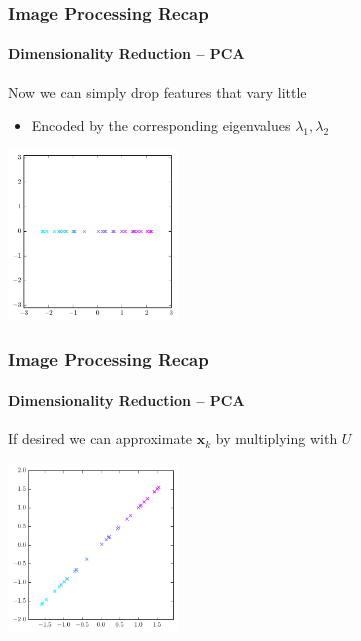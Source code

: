 \documentclass[xetex,professionalfont]{beamer}
\renewcommand{\vec}[1]{\ensuremath{\mathbf{#1}}}
\newcommand{\vx}{\vec{x}}
\begin{document}

\begin{frame}
\frametitle{Image Processing Recap}
\framesubtitle{Dimensionality Reduction -- PCA}

Now we can simply drop features that vary little  %
\begin{itemize}
    \item Encoded by the corresponding eigenvalues $\lambda_1,\lambda_2$
\end{itemize}

\begin{center}
\includegraphics[width=4.5cm]{figures/pca-reduced.pdf}
\end{center}

\end{frame}


\begin{frame}
\frametitle{Image Processing Recap}
\framesubtitle{Dimensionality Reduction -- PCA}

If desired we can approximate $\vx_k$ by multiplying with $U$  %

\begin{center}
\includegraphics[width=4.5cm]{figures/pca-reconstructed.pdf}
\end{center}

\end{frame}
\end{document}
